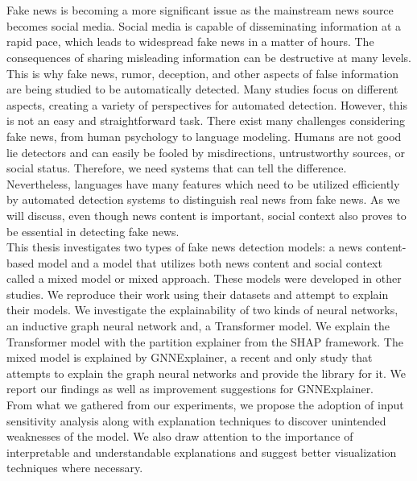 \chapter{\abstractname}


Fake news is becoming a more significant issue as the mainstream news source becomes social media. Social media is capable of disseminating information at a rapid pace, which leads to widespread fake news in a matter of hours. The consequences of sharing misleading information can be destructive at many levels. This is why fake news, rumor, deception, and other aspects of false information are being studied to be automatically detected. Many studies focus on different aspects, creating a variety of perspectives for automated detection. However, this is not an easy and straightforward task. There exist many challenges considering fake news, from human psychology to language modeling. Humans are not good lie detectors and can easily be fooled by misdirections, untrustworthy sources, or social status. Therefore, we need systems that can tell the difference.\\
Nevertheless, languages have many features which need to be utilized efficiently by automated detection systems to distinguish real news from fake news. As we will discuss, even though news content is important, social context also proves to be essential in detecting fake news.\\
This thesis investigates two types of fake news detection models: a news content-based model and a model that utilizes both news content and social context called a mixed model or mixed approach.  These models were developed in other studies. We reproduce their work using their datasets and attempt to explain their models. We investigate the explainability of two kinds of neural networks, an inductive graph neural network and, a Transformer model. We explain the Transformer model with the partition explainer from the SHAP framework. The mixed model is explained by GNNExplainer, a recent and only study that attempts to explain the graph neural networks and provide the library for it. We report our findings as well as improvement suggestions for GNNExplainer.\\
From what we gathered from our experiments, we propose the adoption of input sensitivity analysis along with explanation techniques to discover unintended weaknesses of  the model. We also draw attention to the importance of interpretable and understandable explanations and suggest better visualization techniques where necessary.
